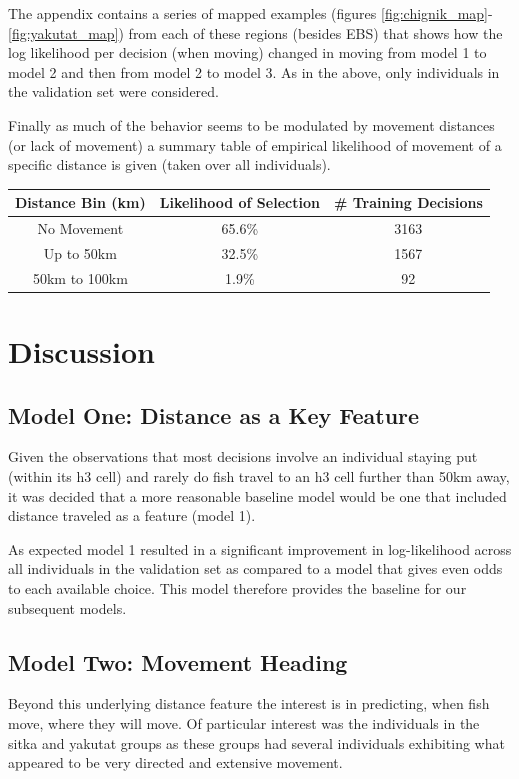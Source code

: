 \documentclass[11pt]{article}
\begin{document}
The appendix contains a series of mapped examples (figures \ref{fig:chignik_map}-\ref{fig:yakutat_map}) from each of these regions (besides EBS) that shows how the log likelihood per decision (when moving) changed in moving from model 1 to model 2 and then from model 2 to model 3. As in the above, only individuals in the validation set were considered.\newline

Finally as much of the behavior seems to be modulated by movement distances (or lack of movement) a summary table of empirical likelihood of movement of a specific distance is given (taken over all individuals). 

\begin{center}
\begin{tabular}{| c | c | c |}
\hline
Distance Bin (km) & Likelihood of Selection & \# Training Decisions \\
\hline
No Movement & 65.6\% & 3163 \\
Up to 50km & 32.5\% & 1567 \\
50km to 100km & 1.9\% & 92 \\
\hline

\end{tabular}
\end{center}


\section*{Discussion}

\subsection*{Model One: Distance as a Key Feature}
Given the observations that most decisions involve an individual staying put (within its h3 cell) and rarely do fish travel to an h3 cell further than 50km away, it was decided that a more reasonable baseline model would be one that included distance traveled as a feature (model 1). 

As expected model 1 resulted in a significant improvement in log-likelihood across all individuals in the validation set as compared to a model that gives even odds to each available choice. This model therefore provides the baseline for our subsequent models. 

\subsection*{Model Two: Movement Heading}
Beyond this underlying distance feature the interest is in predicting, when fish move, where they will move. Of particular interest was the individuals in the sitka and yakutat groups as these groups had several individuals exhibiting what appeared to be very directed and extensive movement. 
\end{document}

